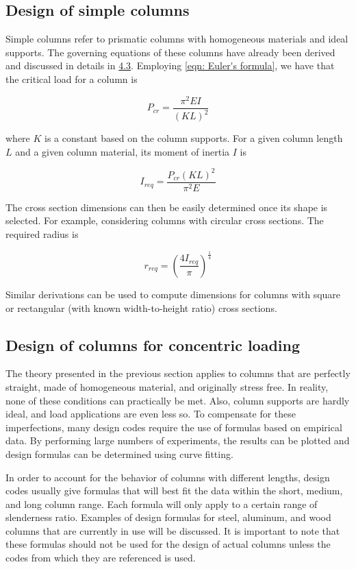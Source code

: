 \documentclass[a4paper,openany,12pt]{book}
\begin{document}
{{\subsection{Design of simple columns}
\label{design-of-simple-columns}
Simple columns refer to prismatic columns with homogeneous materials and
ideal supports. The governing equations of these columns have already
been derived and discussed in details in \hyperref[section: buckling]{4.3}.
Employing \ref{eqn: Euler's formula}, we have
that the critical load for a column is

$$P_{cr} = \frac{\pi ^2EI}{(KL)^2}$$

where \(K\) is a constant based on the column supports. For a given column
length \(L\) and a given column material, its moment of inertia \(I\) is

$$I_{req} = \frac{P_{cr}(KL)^2}{\pi ^2E}$$

The cross section dimensions can then be easily determined once its
shape is selected. For example, considering columns with circular cross
sections. The required radius is

$$r_{req} = \left( \frac{4I_{req}}{\pi } \right)^{\frac{1}{4}}$$

Similar derivations can be used to compute dimensions for columns with
square or rectangular (with known width-to-height ratio) cross sections.

\subsection{Design of columns for concentric loading}
\label{subsection: column concentric loading}
The theory presented in the previous section applies to columns that are
perfectly straight, made of homogeneous material, and originally stress
free. In reality, none of these conditions can practically be met. Also,
column supports are hardly ideal, and load applications are even less
so. To compensate for these imperfections, many design codes require the
use of formulas based on empirical data. By performing large numbers of
experiments, the results can be plotted and design formulas can be
determined using curve fitting.

In order to account for the behavior of columns with different lengths,
design codes usually give formulas that will best fit the data within
the short, medium, and long column range. Each formula will only apply
to a certain range of slenderness ratio. Examples of design formulas for
steel, aluminum, and wood columns that are currently in use will be
discussed. It is important to note that these formulas should not be
used for the design of actual columns unless the codes from which they
are referenced is used.

}}
\end{document}
